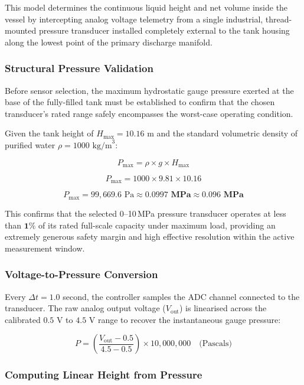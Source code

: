 \documentclass[12pt,a4paper]{article}
\begin{document}
This model determines the continuous liquid height and net volume inside the vessel by intercepting analog voltage telemetry from a single industrial, thread-mounted pressure transducer installed completely external to the tank housing along the lowest point of the primary discharge manifold.

\subsubsection*{Structural Pressure Validation}

Before sensor selection, the maximum hydrostatic gauge pressure exerted at the base of the fully-filled tank must be established to confirm that the chosen transducer's rated range safely encompasses the worst-case operating condition.

Given the tank height of $H_{\text{max}} = 10.16\text{ m}$ and the standard volumetric density of purified water $\rho = 1000\text{ kg/m}^3$:

\[
P_{\text{max}} = \rho \times g \times H_{\text{max}}
\]

\[
P_{\text{max}} = 1000 \times 9.81 \times 10.16
\]

\[
P_{\text{max}} = 99{,}669.6 \text{ Pa} \approx \mathbf{0.0997 \text{ MPa}} \approx \mathbf{0.096 \text{ MPa}}
\]

This confirms that the selected 0--10\,MPa pressure transducer operates at less than $\mathbf{1\%}$ of its rated full-scale capacity under maximum load, providing an extremely generous safety margin and high effective resolution within the active measurement window.

\subsubsection*{Voltage-to-Pressure Conversion}

Every $\Delta t = 1.0$ second, the controller samples the ADC channel connected to the transducer. The raw analog output voltage ($V_{\text{out}}$) is linearised across the calibrated $0.5\text{ V}$ to $4.5\text{ V}$ range to recover the instantaneous gauge pressure:

\[
P = \left( \frac{V_{\text{out}} - 0.5}{4.5 - 0.5} \right) \times 10{,}000{,}000
\quad \text{(Pascals)}
\]

\subsubsection*{Computing Linear Height from Pressure}
\end{document}
